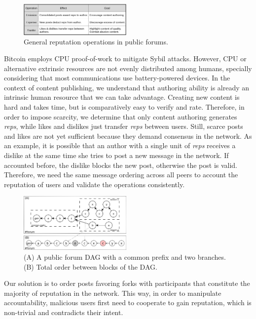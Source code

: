 \documentclass[10pt,journal,compsoc]{IEEEtran}
\newcommand{\reps}     {\emph{reps}\xspace}
\begin{document}
\begin{figure}
\centering
\includegraphics[width=0.49\textwidth]{general.png}
\caption{General reputation operations in public forums.}
\label{fig.general}
\end{figure}

Bitcoin employs CPU proof-of-work to mitigate Sybil attacks.
However, CPU or alternative extrinsic resources are not evenly distributed
among humans, specially considering that most communications use
battery-powered devices.
%
In the context of content publishing, we understand that authoring ability is
already an intrinsic human resource that we can take advantage.
Creating new content is hard and takes time, but is comparatively easy to
verify and rate.
Therefore, in order to impose scarcity, we determine that only content
authoring generates \reps, while likes and dislikes just transfer \reps between
users.
%
Still, scarce posts and likes are not yet sufficient because they demand
consensus in the network.
As an example, it is possible that an author with a single unit of \reps
receives a dislike at the same time she tries to post a new message in the
network.
If accounted before, the dislike blocks the new post, otherwise the post is
valid.
Therefore, we need the same message ordering across all peers to account the
reputation of users and validate the operations consistently.

\begin{figure}
\centering
\includegraphics[width=0.49\textwidth]{reps2.png}
\caption{
    (A) A public forum DAG with a common prefix and two branches.
    (B) Total order between blocks of the DAG.
}
\label{fig.reps}
\end{figure}

Our solution is to order posts favoring forks with participants that constitute
the majority of reputation in the network.
This way, in order to manipulate accountability, malicious users first need to
cooperate to gain reputation, which is non-trivial and contradicts their
intent.
\end{document}
